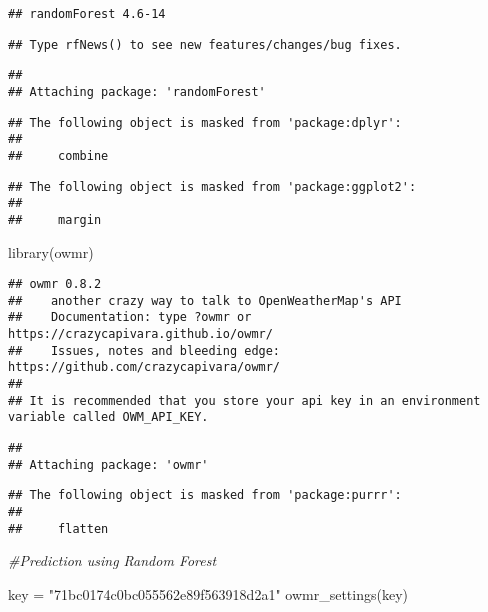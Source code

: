\documentclass[
]{article}
\newenvironment{Shaded}{\begin{snugshade}}{\end{snugshade}}
\newcommand{\CommentTok}[1]{\textcolor[rgb]{0.56,0.35,0.01}{\textit{#1}}}
\newcommand{\FunctionTok}[1]{\textcolor[rgb]{0.00,0.00,0.00}{#1}}
\newcommand{\NormalTok}[1]{#1}
\newcommand{\OtherTok}[1]{\textcolor[rgb]{0.56,0.35,0.01}{#1}}
\newcommand{\StringTok}[1]{\textcolor[rgb]{0.31,0.60,0.02}{#1}}
\begin{document}
\begin{verbatim}
## randomForest 4.6-14
\end{verbatim}

\begin{verbatim}
## Type rfNews() to see new features/changes/bug fixes.
\end{verbatim}

\begin{verbatim}
## 
## Attaching package: 'randomForest'
\end{verbatim}

\begin{verbatim}
## The following object is masked from 'package:dplyr':
## 
##     combine
\end{verbatim}

\begin{verbatim}
## The following object is masked from 'package:ggplot2':
## 
##     margin
\end{verbatim}

\begin{Shaded}
\begin{Highlighting}[]
\FunctionTok{library}\NormalTok{(owmr)}
\end{Highlighting}
\end{Shaded}

\begin{verbatim}
## owmr 0.8.2
##    another crazy way to talk to OpenWeatherMap's API
##    Documentation: type ?owmr or https://crazycapivara.github.io/owmr/
##    Issues, notes and bleeding edge: https://github.com/crazycapivara/owmr/
## 
## It is recommended that you store your api key in an environment variable called OWM_API_KEY.
\end{verbatim}

\begin{verbatim}
## 
## Attaching package: 'owmr'
\end{verbatim}

\begin{verbatim}
## The following object is masked from 'package:purrr':
## 
##     flatten
\end{verbatim}

\begin{Shaded}
\begin{Highlighting}[]
\CommentTok{\#Prediction using Random Forest}

\NormalTok{key }\OtherTok{=} \StringTok{"71bc0174c0bc055562e89f563918d2a1"}
\FunctionTok{owmr\_settings}\NormalTok{(key)}
\end{Highlighting}
\end{Shaded}
\end{document}
